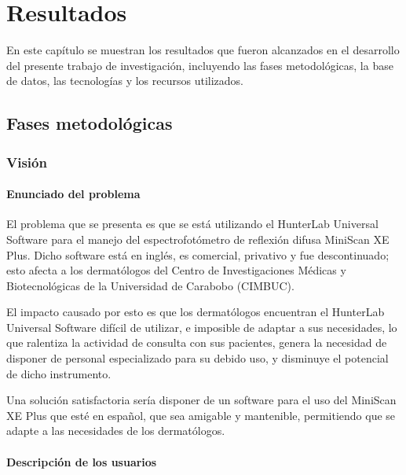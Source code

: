 \chapter{Resultados}

En este cap\'{i}tulo se muestran los resultados que fueron alcanzados en el desarrollo del presente trabajo de investigaci\'{o}n, incluyendo las fases metodol\'{o}gicas, la base de datos, las tecnolog\'{i}as y los recursos utilizados.

\section{Fases metodol\'{o}gicas}

\subsection{Visi\'{o}n}
	
	\subsubsection{Enunciado del problema}
	
	El problema que se presenta es que se est\'{a} utilizando el HunterLab Universal Software para el manejo del espectrofot\'{o}metro de reflexi\'{o}n difusa MiniScan XE Plus. Dicho software est\'{a} en ingl\'{e}s, es comercial, privativo y fue descontinuado; esto afecta a los dermat\'{o}logos del Centro de Investigaciones M\'{e}dicas y Biotecnol\'{o}gicas de la Universidad de Carabobo (CIMBUC).
	
	El impacto causado por esto es que los dermat\'{o}logos encuentran el HunterLab Universal Software dif\'{i}cil de utilizar, e imposible de adaptar a sus necesidades, lo que ralentiza la actividad de consulta con sus pacientes, genera la necesidad de disponer de personal especializado para su debido uso, y disminuye el potencial de dicho instrumento.
	
	Una soluci\'{o}n satisfactoria ser\'{i}a disponer de un software para el uso del \mbox{MiniScan} XE Plus que est\'{e} en espa\~{n}ol, que sea amigable y mantenible, permitiendo que se adapte a las necesidades de los dermat\'{o}logos.
	
	\subsubsection{Descripci\'{o}n de los usuarios}
	
